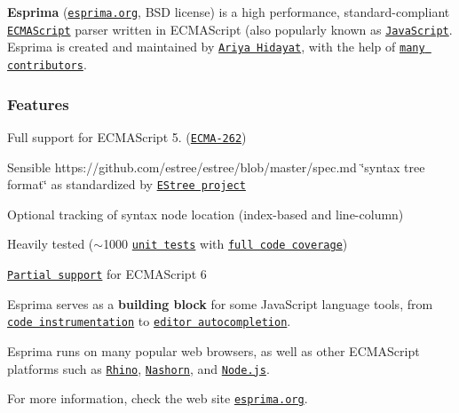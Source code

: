 {\bfseries Esprima} (\href{http://esprima.org}{\tt esprima.\+org}, B\+S\+D license) is a high performance, standard-\/compliant \href{http://www.ecma-international.org/publications/standards/Ecma-262.htm}{\tt E\+C\+M\+A\+Script} parser written in E\+C\+M\+A\+Script (also popularly known as \href{https://en.wikipedia.org/wiki/JavaScript}{\tt Java\+Script}. Esprima is created and maintained by \href{https://twitter.com/ariyahidayat}{\tt Ariya Hidayat}, with the help of \href{https://github.com/jquery/esprima/contributors}{\tt many contributors}.

\subsubsection*{Features}


\begin{DoxyItemize}
\item Full support for E\+C\+M\+A\+Script 5. (\href{http://www.ecma-international.org/publications/standards/Ecma-262.htm}{\tt E\+C\+M\+A-\/262})
\item Sensible https\+://github.com/estree/estree/blob/master/spec.\+md \char`\"{}syntax tree format\char`\"{} as standardized by \href{https://github.com/estree/estree}{\tt E\+Stree project}
\item Optional tracking of syntax node location (index-\/based and line-\/column)
\item Heavily tested ($\sim$1000 \href{https://github.com/jquery/esprima/tree/master/test/fixtures}{\tt unit tests} with \href{https://travis-ci.org/jquery/esprima}{\tt full code coverage})
\item \href{https://github.com/jquery/esprima/issues/1099}{\tt Partial support} for E\+C\+M\+A\+Script 6
\end{DoxyItemize}

Esprima serves as a {\bfseries building block} for some Java\+Script language tools, from \href{http://esprima.org/demo/functiontrace.html}{\tt code instrumentation} to \href{http://esprima.org/demo/autocomplete.html}{\tt editor autocompletion}.

Esprima runs on many popular web browsers, as well as other E\+C\+M\+A\+Script platforms such as \href{http://www.mozilla.org/rhino}{\tt Rhino}, \href{http://openjdk.java.net/projects/nashorn/}{\tt Nashorn}, and \href{https://npmjs.org/package/esprima}{\tt Node.\+js}.

For more information, check the web site \href{http://esprima.org}{\tt esprima.\+org}. 